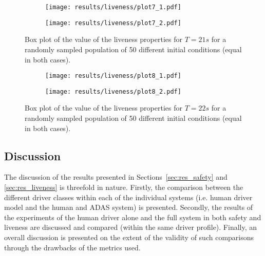 \begin{figure}[H]
\centering
\begin{subfigure}{0.75\textwidth}
  \centering
  \texttt{[image: results/liveness/plot7\_1.pdf]}
\end{subfigure}
\begin{subfigure}{0.75\textwidth}
  \centering
  \texttt{[image: results/liveness/plot7\_2.pdf]}
\end{subfigure} 
\caption{Box plot of the value of the liveness properties for $T = 21s$ for a randomly sampled population of 50 different initial conditions (equal in both cases).}
\label{fig:plot7}
\end{figure}

\begin{figure}[H]
\centering
\begin{subfigure}{0.75\textwidth}
  \centering
  \texttt{[image: results/liveness/plot8\_1.pdf]}
\end{subfigure}
\begin{subfigure}{0.75\textwidth}
  \centering
  \texttt{[image: results/liveness/plot8\_2.pdf]}
\end{subfigure} 
\caption{Box plot of the value of the liveness properties for $T = 22s$ for a randomly sampled population of 50 different initial conditions (equal in both cases).}
\label{fig:plot8}
\end{figure}

\subsection{Discussion}

The discussion of the results presented in Sections~\ref{sec:res_safety} and \ref{sec:res_liveness} is threefold in nature. Firstly, the comparison between the different driver classes within each of the individual systems (i.e. human driver model and the human and ADAS system) is presented. Secondly, the results of the experiments of the human driver alone and the full system in both safety and liveness are discussed and compared (within the same driver profile). Finally, an overall discussion is presented on the extent of the validity of such comparisons through the drawbacks of the metrics used.

